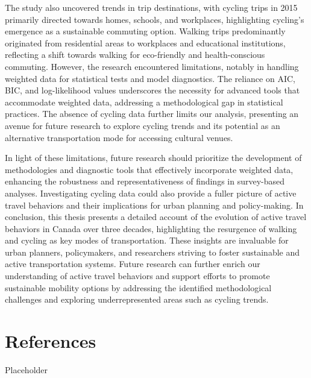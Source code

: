 \documentclass[
11pt, %
oneside, %
english, %
singlespacing, %
]{macthesis} %
\begin{document}
The study also uncovered trends in trip destinations, with cycling trips in 2015 primarily directed towards homes, schools, and workplaces, highlighting cycling's emergence as a sustainable commuting option. Walking trips predominantly originated from residential areas to workplaces and educational institutions, reflecting a shift towards walking for eco-friendly and health-conscious commuting.
However, the research encountered limitations, notably in handling weighted data for statistical tests and model diagnostics. The reliance on AIC, BIC, and log-likelihood values underscores the necessity for advanced tools that accommodate weighted data, addressing a methodological gap in statistical practices. The absence of cycling data further limits our analysis, presenting an avenue for future research to explore cycling trends and its potential as an alternative transportation mode for accessing cultural venues.

In light of these limitations, future research should prioritize the development of methodologies and diagnostic tools that effectively incorporate weighted data, enhancing the robustness and representativeness of findings in survey-based analyses. Investigating cycling data could also provide a fuller picture of active travel behaviors and their implications for urban planning and policy-making.
In conclusion, this thesis presents a detailed account of the evolution of active travel behaviors in Canada over three decades, highlighting the resurgence of walking and cycling as key modes of transportation. These insights are invaluable for urban planners, policymakers, and researchers striving to foster sustainable and active transportation systems. Future research can further enrich our understanding of active travel behaviors and support efforts to promote sustainable mobility options by addressing the identified methodological challenges and exploring underrepresented areas such as cycling trends.

\hypertarget{references}{%
\chapter*{References}\label{references}}

Placeholder
\end{document}
